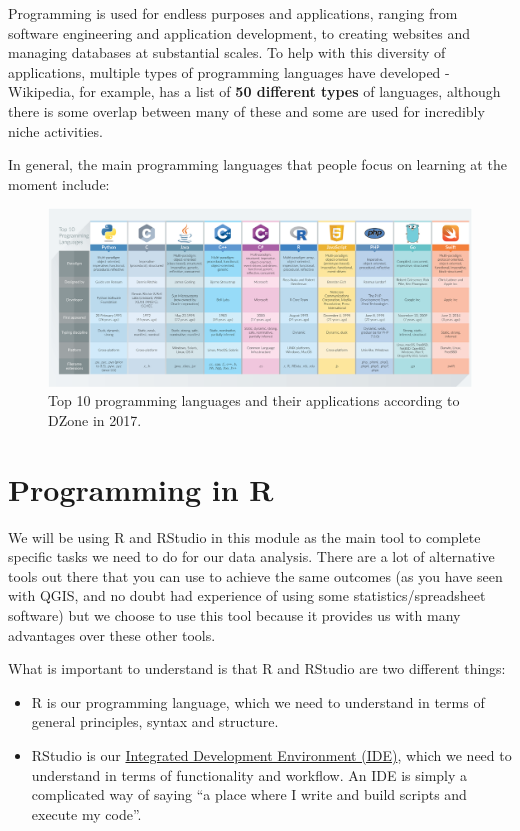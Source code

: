 \documentclass[
]{book}
\providecommand{\tightlist}{%
  \setlength{\itemsep}{0pt}\setlength{\parskip}{0pt}}
\begin{document}
Programming is used for endless purposes and applications, ranging from software engineering and application development, to creating websites and managing databases at substantial scales. To help with this diversity of applications, multiple types of programming languages have developed - Wikipedia, for example, has a list of \textbf{50 different types} of languages, although there is some overlap between many of these and some are used for incredibly niche activities.

In general, the main programming languages that people focus on learning at the moment include:

\begin{figure}

{\centering \includegraphics[width=0.9\linewidth]{images/w04/programming_languages} 

}

\caption{Top 10 programming languages and their applications according to DZone in 2017.}\label{fig:04-programming-languages}
\end{figure}

\hypertarget{programming-in-r}{%
\section{Programming in R}\label{programming-in-r}}

We will be using R and RStudio in this module as the main tool to complete specific tasks we need to do for our data analysis. There are a lot of alternative tools out there that you can use to achieve the same outcomes (as you have seen with QGIS, and no doubt had experience of using some statistics/spreadsheet software) but we choose to use this tool because it provides us with many advantages over these other tools.

What is important to understand is that R and RStudio are two different things:

\begin{itemize}
\tightlist
\item
  R is our programming language, which we need to understand in terms of general principles, syntax and structure.
\item
  RStudio is our \href{https://en.wikipedia.org/wiki/Integrated_development_environment}{Integrated Development Environment (IDE)}, which we need to understand in terms of functionality and workflow. An IDE is simply a complicated way of saying ``a place where I write and build scripts and execute my code''.
\end{itemize}
\end{document}
